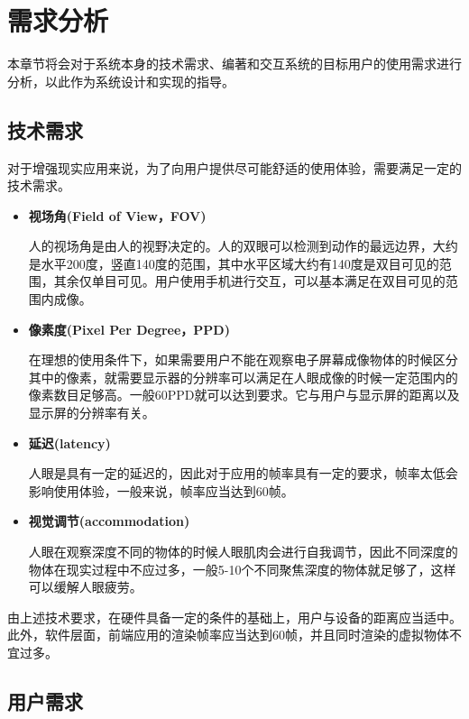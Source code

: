 \chapter{需求分析}
\label{requirement}

本章节将会对于系统本身的技术需求、编著和交互系统的目标用户的使用需求进行分析，以此作为系统设计和实现的指导。

\section{技术需求}
对于增强现实应用来说，为了向用户提供尽可能舒适的使用体验，需要满足一定的技术需求。\cite{artech}

\begin{itemize}
    \item \textbf{视场角(Field of View，FOV)}
    
       人的视场角是由人的视野决定的。人的双眼可以检测到动作的最远边界，大约是水平200度，竖直140度的范围，其中水平区域大约有140度是双目可见的范围，其余仅单目可见。用户使用手机进行交互，可以基本满足在双目可见的范围内成像。
    
    \item \textbf{像素度(Pixel Per Degree，PPD)}
    
     在理想的使用条件下，如果需要用户不能在观察电子屏幕成像物体的时候区分其中的像素，就需要显示器的分辨率可以满足在人眼成像的时候一定范围内的像素数目足够高。一般60PPD就可以达到要求。它与用户与显示屏的距离以及显示屏的分辨率有关。
    
    \item \textbf{延迟(latency)}
    
      人眼是具有一定的延迟的，因此对于应用的帧率具有一定的要求，帧率太低会影响使用体验，一般来说，帧率应当达到60帧。
    
    \item \textbf{视觉调节(accommodation)}
    
    人眼在观察深度不同的物体的时候人眼肌肉会进行自我调节，因此不同深度的物体在现实过程中不应过多，一般5-10个不同聚焦深度的物体就足够了，这样可以缓解人眼疲劳。
\end{itemize}

\indent    	由上述技术要求，在硬件具备一定的条件的基础上，用户与设备的距离应当适中。此外，软件层面，前端应用的渲染帧率应当达到60帧，并且同时渲染的虚拟物体不宜过多。

\section{用户需求}

